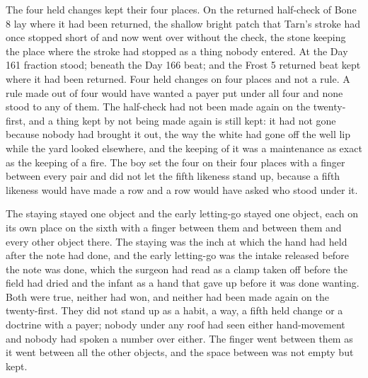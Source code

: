 The four held changes kept their four places. On  the returned half-check of Bone 8 lay where it had been returned, the shallow bright patch that Tarn's stroke had once stopped short of and now went over without the check, the stone keeping the place where the stroke had stopped as a thing nobody entered. At  the Day 161 fraction stood; beneath  the Day 166 beat; and the Frost 5 returned beat kept where it had been returned. Four held changes on four places and not a rule. A rule made out of four would have wanted a payer put under all four and none stood to any of them. The half-check had not been made again on the twenty-first, and a thing kept by not being made again is still kept: it had not gone because nobody had brought it out, the way the white had gone off the well lip while the yard looked elsewhere, and the keeping of it was a maintenance as exact as the keeping of a fire. The boy set the four on their four places with a finger between every pair and did not let the fifth likeness stand up, because a fifth likeness would have made a row and a row would have asked who stood under it.

\scenebreak

The staying stayed one object and the early letting-go stayed one object, each on its own place on the sixth with a finger between them and between them and every other object there. The staying was the inch at which the hand had held after the note had done, and the early letting-go was the intake released before the note was done, which the surgeon had read as a clamp taken off before the field had dried and the infant as a hand that gave up before it was done wanting. Both were true, neither had won, and neither had been made again on the twenty-first. They did not stand up as a habit, a way, a fifth held change or a doctrine with a payer; nobody under any roof had seen either hand-movement and nobody had spoken a number over either. The finger went between them as it went between all the other objects, and the space between was not empty but kept.

